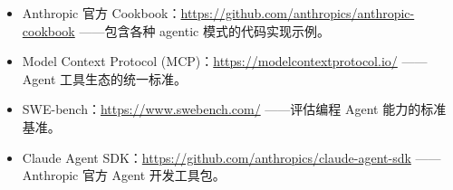 \begin{itemize}
    \item Anthropic 官方 Cookbook：\url{https://github.com/anthropics/anthropic-cookbook} ——包含各种 agentic 模式的代码实现示例。
    \item Model Context Protocol (MCP)：\url{https://modelcontextprotocol.io/} ——Agent 工具生态的统一标准。
    \item SWE-bench：\url{https://www.swebench.com/} ——评估编程 Agent 能力的标准基准。
    \item Claude Agent SDK：\url{https://github.com/anthropics/claude-agent-sdk} ——Anthropic 官方 Agent 开发工具包。
\end{itemize}



